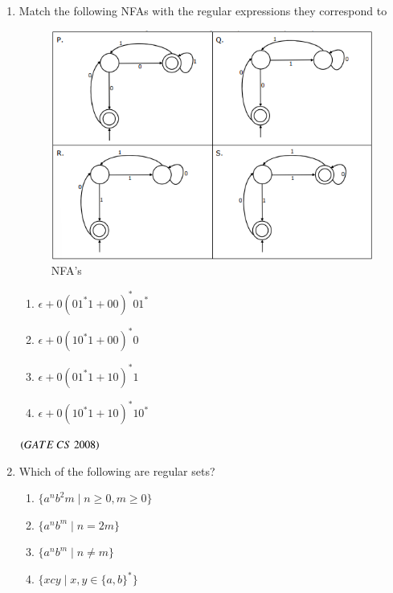 \documentclass[journal]{IEEEtran}
\numberwithin{equation}{enumi}
\numberwithin{figure}{enumi}
\begin{document}
\begin{enumerate}
\item Match the following NFAs with the regular expressions they correspond to 
\begin{figure}[H]
    \centering
    \includegraphics[width=0.5\columnwidth]{figs/fig7.png}
    \caption{NFA's}
    \label{fig:7}
\end{figure}
\begin{center}
\begin{enumerate}
    \item $\epsilon + 0(01^{*}1 + 00)^{*}01^{*}$
    \item $\epsilon + 0(10^{*}1 + 00)^{*}0$
    \item $\epsilon + 0(01^{*}1 + 10)^{*}1$
    \item $\epsilon + 0(10^{*}1 + 10)^{*}10^{*}$
\end{enumerate}
\end{center}
\begin{enumerate}
\end{enumerate}
\hfill $\left(GATE\ CS\  2008\right)$

\item Which of the following are regular sets?
\begin{enumerate}  
    \item $\{a^n b^2m \mid n \geq 0, m \geq 0\}$
    \item $\{a^n b^m \mid n = 2m\}$
    \item $\{a^n b^m \mid n \not= m\}$
    \item $\{xcy \mid x, y \in \{a,b\}^*\}$
\end{enumerate}


\end{enumerate}
\end{document}
